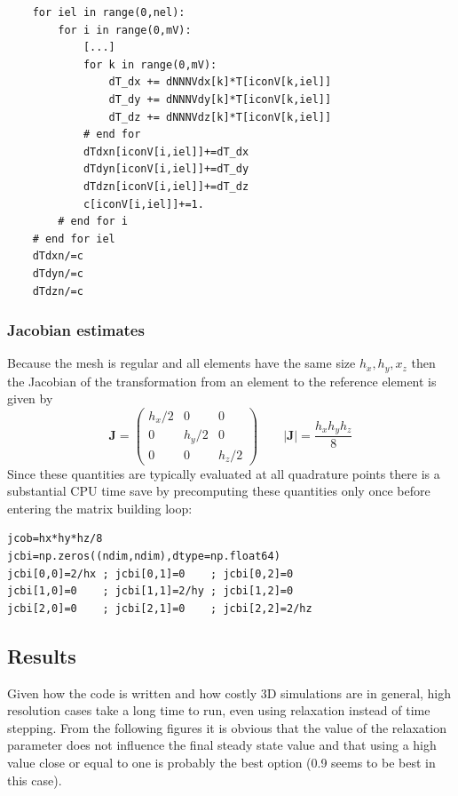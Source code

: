 \begin{lstlisting}
    for iel in range(0,nel):
        for i in range(0,mV):
            [...]
            for k in range(0,mV):
                dT_dx += dNNNVdx[k]*T[iconV[k,iel]]
                dT_dy += dNNNVdy[k]*T[iconV[k,iel]]
                dT_dz += dNNNVdz[k]*T[iconV[k,iel]]
            # end for
            dTdxn[iconV[i,iel]]+=dT_dx
            dTdyn[iconV[i,iel]]+=dT_dy
            dTdzn[iconV[i,iel]]+=dT_dz
            c[iconV[i,iel]]+=1.
        # end for i
    # end for iel
    dTdxn/=c
    dTdyn/=c
    dTdzn/=c
\end{lstlisting}

\subsubsection*{Jacobian estimates}  

Because the mesh is regular and all elements have the same size $h_x,h_y,x_z$
then the Jacobian of the transformation from an element to the reference element
is given by 
\[
{\bm J}=\left( \begin{array}{ccc}
h_x/2 & 0 & 0 \\
0 & h_y/2 & 0 \\
0 & 0 & h_z/2
\end{array} \right)
\qquad
|{\bm J}|=\frac{h_xh_yh_z}{8}
\]
Since these quantities are typically evaluated at all quadrature points 
there is a substantial CPU time save by precomputing these quantities only 
once before entering the matrix building loop:

\begin{lstlisting}
jcob=hx*hy*hz/8
jcbi=np.zeros((ndim,ndim),dtype=np.float64)
jcbi[0,0]=2/hx ; jcbi[0,1]=0    ; jcbi[0,2]=0
jcbi[1,0]=0    ; jcbi[1,1]=2/hy ; jcbi[1,2]=0
jcbi[2,0]=0    ; jcbi[2,1]=0    ; jcbi[2,2]=2/hz
\end{lstlisting}


\newpage
\subsection*{Results}

Given how the code is written and how costly 3D simulations are in general, high resolution
cases take a long time to run, even using relaxation instead of time stepping. 
From the following figures it is obvious that the value of the relaxation parameter 
does not influence the final steady state value and that using a high value close or 
equal to one is probably the best option (0.9 seems to be best in this case). 

